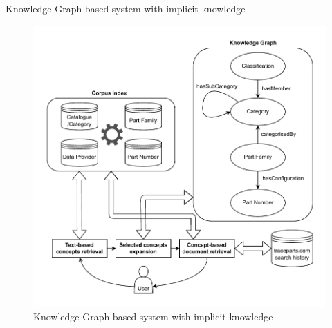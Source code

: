 \begin{frame}{Knowledge Graph-based system with implicit knowledge}

    \begin{figure} [H]
        \begin{center}
            \includegraphics[scale=0.4]{images/tp-expe-kg-based-search-hist-sys.pdf} 
            \caption{Knowledge Graph-based system with implicit knowledge} 
        \end{center}
    \end{figure}

\end{frame}

